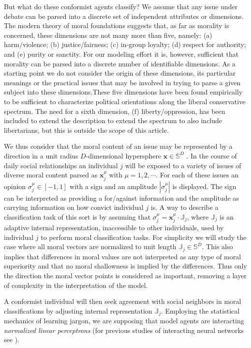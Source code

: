 \documentclass[twocolumn,showpacs]{revtex4-1}
\begin{document}
But what do these conformist agents classify? We assume that any issue under debate can be parsed into a discrete set of independent attributes or dimensions.
 The modern theory of moral foundations \cite{Haidt1} suggests that, as far as morality is concerned, these dimensions are not many more than five, namely: (a) harm/violence;
 (b) justice/fairness; (c) in-group loyalty; (d) respect for authority; and (e) purity or sanctity. For our modeling effort it is, however, sufficient that morality can 
be parsed into a discrete number of identifiable dimensions. As a starting point we do not consider 
the origin of these dimensions, its particular
 meanings or the practical issues that may be involved in  trying to  parse a given subject into these dimensions.These five dimensions have been found empirically to be sufficient
to characterize political orientations along the liberal conservative spectrum.
The need for a sixth dimension, (f) liberty/oppression, has been included 
to extend the description to extend the spectrum to also include libertarians, but this is outside the scope of this article. 
 
We thus consider that the moral content of an issue may be represented by a direction in a unit radius $D$-dimensional hypersphere $\mathbf{x}\in \mathbb{S}^D$ . In the course of  daily social relationships an individual $j$ will
 be exposed to a variety  of issues of diverse
 moral content parsed  as  $\mathbf{x}_j^\mu$ with $\mu=1,2,\cdots$. For each of these issues an opinion $\sigma_j^\mu \in [-1,1]$ with a sign 
and an amplitude $|\sigma_j^\mu|$ is displayed. The sign can be interpreted as providing a for/against information and the amplitude
 as carrying information on how convict individual $j$ is. A way to describe
 a classification task of this sort is by assuming that $\sigma_j^\mu=\mathbf{x}_j^\mu\cdot\mathbb{J}_j$, where $\mathbb{J}_j$ is an adaptive internal 
representation, inaccessible  to other individuals, used by individual $j$ to perform moral classification tasks. For simplicity we will study the case where all  moral
 vectors are normalized to unit length $\mathbb{J}_j \in \mathbb{S}^D$. This also implies that differences in moral values are not interpreted as 
any type of moral superiority and that no  moral shallowness is implied by the differences. Thus only the direction  the moral vector points is considered as important, removing a layer of complexity in the interpretation of the model.


A conformist individual will then seek  agreement
 with social neighbors in moral classifications by adjusting internal representation $\mathbb{J}_j$. 
Employing the statistical mechanics of learning jargon, we are  supposing that model  agents are interacting {\it normalized linear perceptrons}  \cite{Engel} (for previous studies of interacting neural networks see \cite{Metzler00interactingneuralPRE,Vicente} ). 
\end{document}
